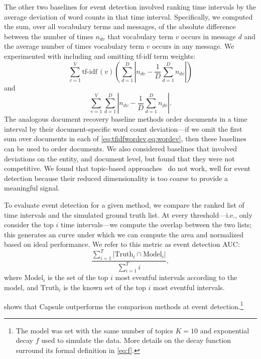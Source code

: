 The other two baselines for event detection involved ranking time intervals by
the average deviation of word counts in that time interval.
Specifically, we computed the
sum, over all vocabulary terms and messages, of the absolute
difference between the number of times $n_{dv}$ that vocabulary term
$v$ occurs in message $d$ and the average number of times vocabulary
term $v$ occurs in any message. We experimented with including and
omitting tf-idf term weights:
\begin{equation}
  \sum_{v=1}^V \textrm{tf-idf}\,(v) \left(\sum_{d=1}^D \left\lvert n_{dv} - \frac{1}{D}\sum_{d=1}^D
  n_{dv} \right\rvert\right)
\label{eq:tfidfwordev}
\end{equation}
and
\begin{equation}
  \sum_{v=1}^V \sum_{d=1}^D \left\lvert n_{dv} - \frac{1}{D}\sum_{d=1}^D
  n_{dv} \right\rvert.
\label{eq:wordev}
\end{equation}
The analogous document recovery baseline methods order documents in a time interval by
their document-specific word count deviation---if we omit the first sum over documents in 
each of \cref{eq:tfidfwordev,eq:wordev}, then these baselines can be used to order documents.
We also considered baselines that involved deviations on the entity,
and document level, but found that they were not competitive. We
found that topic-based approaches~\cite{dou2012leadline} do not work,
well for event detection because their reduced dimensionality is too
coarse to provide a meaningful signal.


To evaluate event detection for a given method, we compare the ranked list of time intervals and the simulated ground truth list.  At every threshold---i.e., only consider the top $i$ time intervals---we compute the overlap between the two lists; this generates an curve under which we can compute the area and normalized based on ideal performance.  We refer to this metric as event detection AUC:
\begin{equation}
\frac{\sum_{i=1}^T \vert \mbox{Truth}_i \cap \mbox{Model}_i \vert}{\sum_{i=1}^T i},
\end{equation}
where $\mbox{Model}_i$ is the set of the top $i$ most eventful intervals
according to the model, and $\mbox{Truth}_i$ is the known set of the
top $i$ most eventful intervals.

 shows that Capsule outperforms the
comparison methods at event detection.\footnote{The model was
  set with the same number of topics $K=10$ and exponential decay $f$
  used to simulate the data.  More details on the decay function
  surround its formal definition in \cref{eq:f}.}

